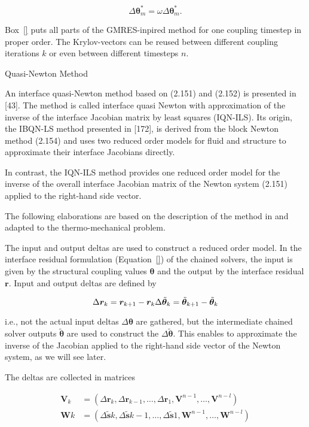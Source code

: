 $$
\Delta \boldsymbol{\theta}^*_{m}=\omega \Delta \boldsymbol{\theta}^*_{m}.
$$

Box~\ref{} puts all parts of the GMRES-inpired method for one coupling timestep in proper order. The Krylov-vectors can be reused between different coupling iterations $k$ or even between different timesteps $n$.

 Quasi-Newton Method

An interface quasi-Newton method based on (2.151) and (2.152) is presented in [43]. The method is called interface quasi Newton with approximation of the inverse of the interface Jacobian matrix by least squares (IQN-ILS). Its origin, the IBQN-LS method presented in [172], is derived from the block Newton method (2.154) and uses two reduced order models for fluid and structure to approximate their interface Jacobians directly.

In contrast, the IQN-ILS method provides one reduced order model for the inverse of the overall interface Jacobian matrix of the Newton system (2.151) applied to the right-hand side vector.

The following elaborations are based on the description of the method in \cite{gatzhammer} and adapted to the thermo-mechanical problem.

The input and output deltas are used to construct a reduced order model. In the interface residual formulation (Equation~\eqref{}) of the chained solvers, the input is given by the structural coupling values $\boldsymbol \theta$ and the output by the interface residual $\boldsymbol{r}$. Input and output deltas are defined by

$$
\Delta \boldsymbol{r}_{k}=\boldsymbol{r}_{k+1}-\boldsymbol{r}_{k} \\
\Delta \tilde{\boldsymbol{\theta}}_{k}=\tilde{\boldsymbol{\theta}}_{k+1}-\tilde{\boldsymbol{\theta}}_{k}
$$

i.e., not the actual input deltas $\Delta \boldsymbol{\theta}$ are gathered, but the intermediate chained solver outputs $\tilde{\boldsymbol{\theta}}$ are used to construct the $\Delta \tilde{\boldsymbol{\theta}}$. This enables to approximate the inverse of the Jacobian applied to the right-hand side vector of the Newton system, as we will see later.

 The deltas are collected in matrices

$$
\begin{aligned}
\boldsymbol{V}_{k} &=\left(\Delta \boldsymbol{r}_{k}, \Delta \boldsymbol{r}_{k-1}, \ldots, \Delta \boldsymbol{r}_{1}, \boldsymbol{V}^{n-1}, \ldots, \boldsymbol{V}^{n-l}\right) \\
\boldsymbol{W}{k} &=\left(\Delta \tilde{\boldsymbol{s}}{k}, \Delta \tilde{\boldsymbol{s}}{k-1}, \ldots, \Delta \tilde{\boldsymbol{s}}{1}, \boldsymbol{W}^{n-1}, \ldots, \boldsymbol{W}^{n-l}\right)
\end{aligned}
$$

